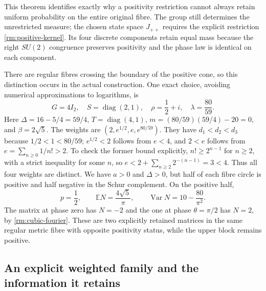 This theorem identifies exactly why a positivity restriction cannot
always retain uniform probability on the entire original fibre.
The group still determines the unrestricted measure; the chosen state
space $J_{++}$ requires the explicit restriction
\eqref{rm:positive-kernel}. Its four discrete components retain equal
mass because the right $SU(2)$ congruence preserves positivity and the
phase law is identical on each component.

There are regular fibres crossing the boundary of the positive cone,
so this distinction occurs in the actual construction. One exact
choice, avoiding numerical approximations to logarithms, is
\begin{equation}\label{rm:crossing-example}
 G=4I_2,\quad S=\operatorname{diag}(2,1),\quad
 \rho=\frac12+i,\quad\lambda=\frac{80}{59}.
\end{equation}
Here $\Delta=16-5/4=59/4$, $T=\operatorname{diag}(4,1)$,
$m=(80/59)(59/4)-20=0$, and $\beta=2\sqrt5$.
The weights are $(2,e^{1/2},e,e^{80/59})$.
They have $d_1<d_2<d_3$ because $1/2<1<80/59$;
$e^{1/2}<2$ follows from $e<4$, and $2<e$ follows from
$e=\sum_{n\geq0}1/n!>2$. To check the former bound explicitly,
$n!\geq2^{n-1}$ for $n\geq2$, with a strict inequality for some $n$,
so $e<2+\sum_{n\geq2}2^{-(n-1)}=3<4$.
Thus all four weights are distinct. We have $a>0$ and $\Delta>0$,
but half of each fibre circle is positive and half negative in the
Schur complement. On the positive half,
\[
 p=\frac12,\qquad
 \mathbb E N=\frac{4\sqrt5}{\pi},\qquad
 \operatorname{Var}N=10-\frac{80}{\pi^2}.
\]
The matrix at phase zero has $N=-2$ and the one at phase $\theta=\pi/2$
has $N=2$, by \eqref{rm:cubic-fourier}. These are two explicitly
retained matrices in the same regular metric fibre with opposite
positivity status, while the upper block remains positive.

\subsection{An explicit weighted family and the information it retains}

